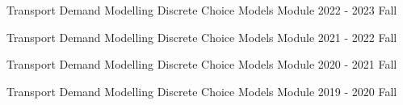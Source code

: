 


\begin{cvteachings}
  \cvteaching
	{Transport Demand Modelling} %
	{Discrete Choice Models Module} %
	{} %
	{2022 - 2023 Fall} %

  \cvteaching
    {Transport Demand Modelling} %
    {Discrete Choice Models Module} %
    {} %
    {2021 - 2022 Fall} %

  \cvteaching
    {Transport Demand Modelling} %
    {Discrete Choice Models Module} %
    {} %
    {2020 - 2021 Fall} %

  \cvteaching
    {Transport Demand Modelling} %
    {Discrete Choice Models Module} %
    {} %
    {2019 - 2020 Fall} %


\end{cvteachings}

